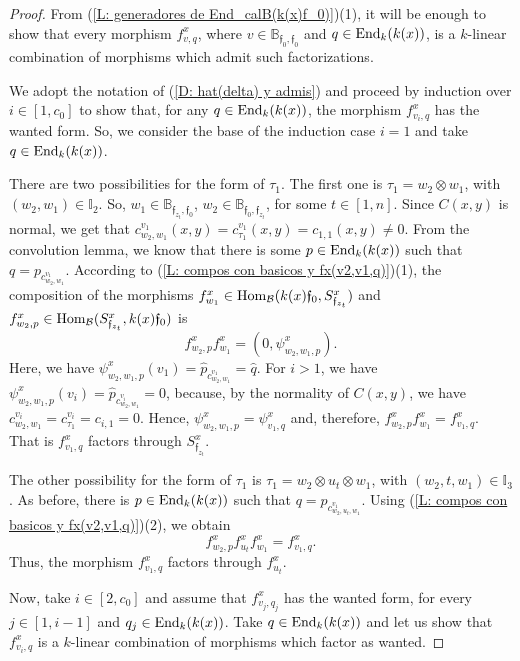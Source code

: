 \documentclass{article}
\theoremstyle{definition}
\newcommand{\End}{{ \rm End }}
\newcommand{\Hom}{{ \rm Hom }}
\renewcommand{\frak}{\mathfrak}
\newcommand{\hueca}[1]{\mathbb{#1}}
\begin{document}
\begin{proof} From (\ref{L: generadores de End_calB(k(x)f_0)})(1), it will be enough to show that every morphism $f^x_{v,q}$, where $v\in \hueca{B}_{\frak{f}_0,\frak{f}_0}$ and $q\in \End_k(k(x))$, is a $k$-linear combination of morphisms which admit such factorizations. 

We adopt the notation of (\ref{D: hat(delta) y admis}) and proceed by induction over $i\in [1,c_0]$ to show that, for any $q\in \End_k(k(x))$, the morphism $f^x_{v_i,q}$ has the wanted form.  So, we consider the base of the induction case $i=1$ and take $q\in \End_k(k(x))$.  

There are two possibilities for the form of $\tau_1$. The first one is $\tau_1=w_2\otimes w_1$, with $(w_2,w_1)\in \hueca{I}_2$. So, $w_1\in \hueca{B}_{\frak{f}_{z_t},\frak{f}_0}$, $w_2\in \hueca{B}_{\frak{f}_0,\frak{f}_{z_t}}$, for some $t\in [1,n]$. Since $C(x,y)$ is normal, we get that $c^{v_1}_{w_2,w_1}(x,y)=c^{v_1}_{\tau_1}(x,y)=c_{1,1}(x,y)\not=0$. From the convolution lemma, we know that there is some $p\in \End_k(k(x))$ such that $q=p_{c^{v_1}_{w_2,w_1}}$. According to (\ref{L: compos con basicos y fx(v2,v1,q)})(1), the composition of the morphisms 
$f^x_{w_1}\in \Hom_{\cal B}(k(x)\frak{f}_0,S^x_{\frak{f}_{z_t}})$ and $f^x_{w_2,p}\in \Hom_{\cal B}(S^x_{\frak{f}_{z_t}},k(x)\frak{f}_0)$ is 
$$f^x_{w_2,p}f^x_{w_1}=(0,\psi^x_{w_2,w_1,p}).$$ 
Here, we have $\psi^x_{w_2,w_1,p}(v_1)=\hat{p}_{c^{v_1}_{w_2,w_1}}=\hat{q}$.  For $i>1$, we have  $\psi^x_{w_2,w_1,p}(v_i)=\hat{p}_{c^{v_i}_{w_2,w_1}}=0$, because, by the normality of $C(x,y)$, we have $c^{v_i}_{w_2,w_1}=c^{v_i}_{\tau_1}=c_{i,1}=0$. Hence, $\psi^x_{w_2,w_1,p}=\psi^x_{v_1,q}$ and, therefore, $f^x_{w_2,p}f^x_{w_1}=f^x_{v_1,q}$. That is $f^x_{v_1,q}$ factors through $S^x_{\frak{f}_{z_t}}$. 

The other possibility for the form of $\tau_1$ is  $\tau_1=w_2\otimes u_t\otimes w_1$, with $(w_2,t,w_1)\in \hueca{I}_3$. As before, there is  $p\in \End_k(k(x))$ such that $q=p_{c^{v_1}_{w_2,u_t,w_1}}$. Using (\ref{L: compos con basicos y fx(v2,v1,q)})(2), we obtain
$$f^x_{w_2,p}f^x_{u_t}f^x_{w_1}=f^x_{v_1,q}.$$
Thus, the morphism $f^x_{v_1,q}$ factors through $f^x_{u_t}$. 

Now, take $i\in [2,c_0]$ and assume that $f^x_{v_j,q_j}$ has the wanted form, for every  $j\in [1,i-1]$ and $q_j\in \End_k(k(x))$. Take $q\in \End_k(k(x))$ and let us show that $f^x_{v_i,q}$ is a $k$-linear combination of morphisms which factor as wanted.  


\end{proof}
\end{document}
